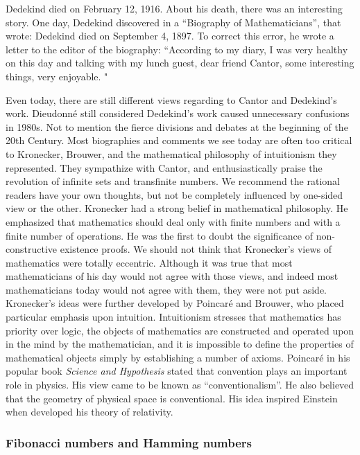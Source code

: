 \documentclass{article}
\begin{document}
Dedekind died on February 12, 1916. About his death, there was an interesting story. One day, Dedekind discovered in a ``Biography of Mathematicians'', that wrote: Dedekind died on September 4, 1897. To correct this error, he wrote a letter to the editor of the biography: ``According to my diary, I was very healthy on this day and talking with my lunch guest, dear friend Cantor, some interesting things, very enjoyable. "\cite{HanXueTao16}

Even today, there are still different views regarding to Cantor and Dedekind's work. Dieudonné still considered Dedekind's work caused unnecessary confusions in 1980s. Not to mention the fierce divisions and debates at the beginning of the 20th Century. Most biographies and comments we see today are often too critical to Kronecker, Brouwer, and the mathematical philosophy of intuitionism they represented. They sympathize with Cantor, and enthusiastically praise the revolution of infinite sets and transfinite numbers. We recommend the rational readers have your own thoughts, but not be completely influenced by one-sided view or the other. Kronecker had a strong belief in mathematical philosophy. He emphasized that mathematics should deal only with finite numbers and with a finite number of operations. He was the first to doubt the significance of non-constructive existence proofs. We should not think that Kronecker's views of mathematics were totally eccentric. Although it was true that most mathematicians of his day would not agree with those views, and indeed most mathematicians today would not agree with them, they were not put aside. Kronecker's ideas were further developed by Poincaré and Brouwer, who placed particular emphasis upon intuition. Intuitionism stresses that mathematics has priority over logic, the objects of mathematics are constructed and operated upon in the mind by the mathematician, and it is impossible to define the properties of mathematical objects simply by establishing a number of axioms. Poincaré in his popular book {\em  Science and Hypothesis} stated that convention plays an important role in physics. His view came to be known as ``conventionalism''. He also believed that the geometry of physical space is conventional. His idea inspired Einstein when developed his theory of relativity.

\subsubsection{Fibonacci numbers and Hamming numbers}
\end{document}
